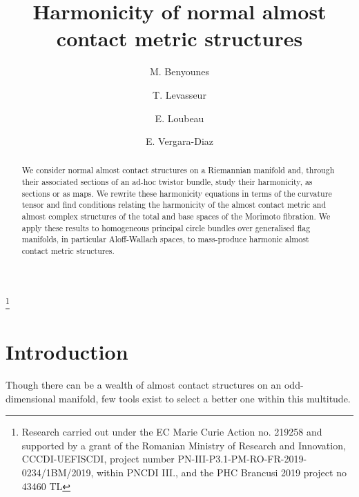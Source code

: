 \documentclass[a4paper,reqno]{amsart}
\theoremstyle{definition}
\theoremstyle{remark}
\theoremstyle{plain}
\numberwithin{equation}{section}
\begin{document}


\title[Normal almost contact metric
structures]{Harmonicity of normal almost contact metric
  structures} 

\author{M. Benyounes}
\author{T. Levasseur}
\author{E. Loubeau}
\address{Universit\'e de  Brest, CNRS UMR 6205, LMBA, F-29238 Brest, France}
\author{E. Vergara-Diaz}


\thanks{Research carried out under the EC Marie Curie Action no. 219258 and supported by a grant of the Romanian Ministry of Research and Innovation, CCCDI-UEFISCDI, project number PN-III-P3.1-PM-RO-FR-2019-0234/1BM/2019, within PNCDI III., and the PHC Brancusi 2019 project no 43460 TL}




\begin{abstract}
  We consider normal almost contact structures on a Riemannian
  manifold and, through their associated sections of an ad-hoc
  twistor bundle, study their harmonicity, as sections or as
  maps. We rewrite these harmonicity equations in terms of the 
  curvature tensor and find conditions relating the
  harmonicity of the almost contact metric and almost complex structures
  of the total and base spaces of the Morimoto fibration. We
  apply these results to homogeneous principal circle bundles over generalised
  flag manifolds, in particular Aloff-Wallach spaces, to mass-produce harmonic almost contact metric structures.
\end{abstract}

\maketitle


\section{Introduction} \label{sec1}

Though there can be a wealth of almost contact structures on an odd-dimensional manifold, few tools exist to select a better one within this multitude. 
\end{document}
